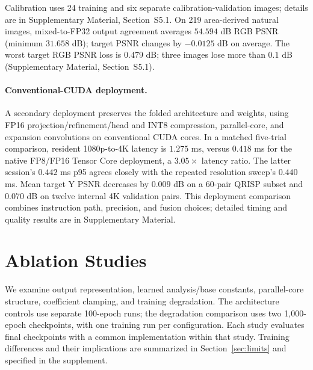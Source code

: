 \documentclass[10pt,twocolumn,letterpaper]{article}
\begin{document}
Calibration uses 24 training and six separate calibration-validation images; details are in Supplementary Material, Section~S5.1.
On 219 area-derived natural images, mixed-to-FP32 output agreement averages $54.594$ dB RGB PSNR (minimum $31.658$ dB); target PSNR changes by $-0.0125$ dB on average.
The worst target RGB PSNR loss is $0.479$ dB; three images lose more than $0.1$ dB (Supplementary Material, Section~S5.1).

\paragraph{Conventional-CUDA deployment.}
A secondary deployment preserves the folded architecture and weights, using FP16 projection/refinement/head and INT8 compression, parallel-core, and expansion convolutions on conventional CUDA cores.
In a matched five-trial comparison, resident 1080p-to-4K latency is $1.275$ ms, versus $0.418$ ms for the native FP8/FP16 Tensor Core deployment, a $3.05\times$ latency ratio.
The latter session's $0.442$ ms p95 agrees closely with the repeated resolution sweep's $0.440$ ms.
Mean target Y PSNR decreases by $0.009$ dB on a 60-pair QRISP subset and $0.070$ dB on twelve internal 4K validation pairs.
This deployment comparison combines instruction path, precision, and fusion choices; detailed timing and quality results are in Supplementary Material.

\section{Ablation Studies}
\label{sec:ablation}
We examine output representation, learned analysis/base constants, parallel-core structure, coefficient clamping, and training degradation.
The architecture controls use separate 100-epoch runs; the degradation comparison uses two 1,000-epoch checkpoints, with one training run per configuration.
Each study evaluates final checkpoints with a common implementation within that study.
Training differences and their implications are summarized in Section~\ref{sec:limits} and specified in the supplement.
\end{document}
